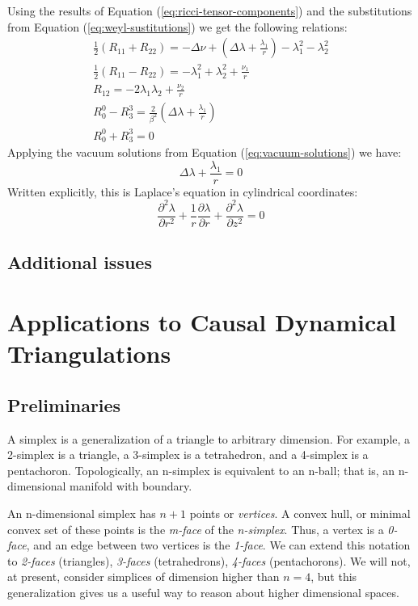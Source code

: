 \documentclass{article}
\begin{document}
Using the results of Equation (\ref{eq:ricci-tensor-components}) and the substitutions from Equation (\ref{eq:weyl-sustitutions}) we get the following relations:
\begin{equation}
\begin{array}{l}
\frac{1}{2}\left(R_{11}+R_{22}\right)=-\Delta\nu+\left(\Delta\lambda+\frac{\lambda_{1}}{r}\right)-\lambda^{2}_{1}-\lambda^{2}_{2} \\
\frac{1}{2}\left(R_{11}-R_{22}\right)=-\lambda^{2}_{1}+\lambda^{2}_{2}+\frac{\nu_{1}}{r}\\
R_{12}=-2\lambda_{1}\lambda_{2}+\frac{\nu_{2}}{r}\\
R_{0}^{0}-R_{3}^{3}=\frac{2}{\beta^{2}}\left(\Delta\lambda+\frac{\lambda_{1}}{r}\right)\\
R_{0}^{0}+R_{3}^{3}=0
\end{array}
\end{equation}
Applying the vacuum solutions from Equation (\ref{eq:vacuum-solutions}) we have:
\begin{equation}
\Delta\lambda+\frac{\lambda_{1}}{r}=0
\end{equation}
Written explicitly, this is Laplace's equation in cylindrical coordinates:
\begin{equation}
\frac{\partial^{2}\lambda}{\partial r^{2}}+\frac{1}{r}\frac{\partial\lambda}{\partial r}+\frac{\partial^{2}\lambda}{\partial z^{2}}=0
\end{equation}
\subsection{Additional issues}



\section{Applications to Causal Dynamical Triangulations}

\subsection{Preliminaries}

A simplex is a generalization of a triangle to arbitrary dimension. For example, a 2-simplex is a triangle, a 3-simplex is a tetrahedron, and a 4-simplex is a pentachoron. Topologically, an n-simplex is equivalent to an n-ball; that is, an n-dimensional manifold with boundary.

An n-dimensional simplex has $n+1$ points or \emph{vertices}. A convex hull, or minimal convex set of these points is the \emph{m-face} of the \emph{n-simplex}. Thus, a vertex is a \emph{0-face}, and an edge between two vertices is the \emph{1-face}. We can extend this notation to \emph{2-faces} (triangles), \emph{3-faces} (tetrahedrons), \emph{4-faces} (pentachorons). We will not, at present, consider simplices of dimension higher than $n=4$, but this generalization gives us a useful way to reason about higher dimensional spaces.
\end{document}
